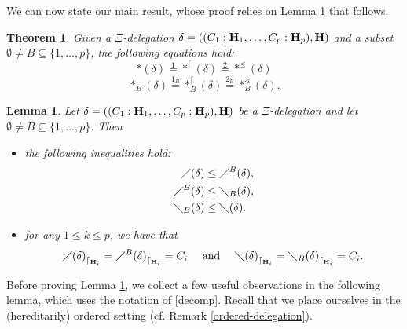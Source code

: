 \documentclass{article}
\theoremstyle{plain}
\newtheorem{theorem}[thm]{Theorem}
\newtheorem{lemma}[thm]{Lemma}
\theoremstyle{definition}
\newcommand{\restrconstr}[2]{{#1}_{\lceil_{#2}}}
\begin{document}
\medskip

 We can now state our main result, whose proof relies on Lemma \ref{interval-inclusion} that follows.
\begin{theorem}\label{interval-product}
Given a $\Xi$-delegation $\delta=((C_1:{\bf H}_1,\dots, C_p:{\bf H}_p),{\bf H})$ and a subset $\emptyset\neq B\subseteq \{1,\dots,p\}$, the following equations hold:
\begin{equation}
\ast(\delta)\stackrel{1}{=}\ast^{\lceil}(\delta)\stackrel{2}{=}\ast^\leq(\delta) \label{eq:equalityProd}
\end{equation}
\begin{equation}
\ast_B(\delta) \stackrel{1_B}{=} \ast_B^{\lceil}(\delta) \stackrel{2_B}{=}\ast_B^\lessdot(\delta).\label{eq:equalityProdB}
\end{equation}
\end{theorem}

\begin{lemma} \label{interval-inclusion}
Let $\delta=((C_1:{\bf H}_1,\dots, C_p:{\bf H}_p),{\bf H})$ be a 
 $\Xi$-delegation and let $\emptyset\neq B\subseteq \{1,\dots,p\}$. Then
\begin{itemize}
\item[a)] the following inequalities hold: \begin{align}
 \diagup(\delta)&\leq\diagup^B(\delta), \label{ineq1}\\
 \diagup^B(\delta) &\leq \diagdown_B(\delta), \label{ineq3} \\
 \diagdown_B(\delta)&\leq\diagdown(\delta). \label{ineq2}
\end{align}
\item[b)] for any $1\leq k\leq p$, we have that $$\restrconstr{\diagup(\delta)}{{\bf H}_i}=\restrconstr{\diagup^B(\delta)}{{\bf H}_i}=C_i \quad \mbox{ and } \quad \restrconstr{\diagdown(\delta)}{{\bf H}_i}=\restrconstr{\diagdown_B(\delta)}{{\bf H}_i}=C_i.$$ 
\end{itemize}
\end{lemma}

Before proving Lemma \ref{interval-inclusion}, we collect a few useful observations in the following lemma, which uses the notation of \eqref{decomp}. Recall that we place ourselves in the (hereditarily) ordered setting (cf. Remark \ref{ordered-delegation}).
\end{document}
